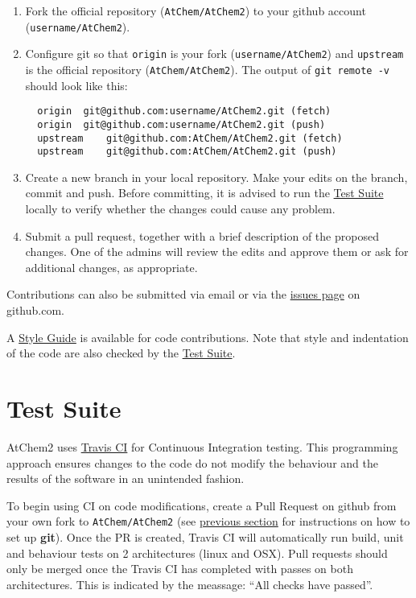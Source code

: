 \begin{enumerate}
\item Fork the official repository (\texttt{AtChem/AtChem2}) to your
  github account (\texttt{username/AtChem2}).
\item Configure git so that \texttt{origin} is your fork
  (\texttt{username/AtChem2}) and \texttt{upstream} is the official
  repository (\texttt{AtChem/AtChem2}). The output of \texttt{git\
    remote\ -v} should look like this:
  \begin{verbatim}
  origin  git@github.com:username/AtChem2.git (fetch)
  origin  git@github.com:username/AtChem2.git (push)
  upstream    git@github.com:AtChem/AtChem2.git (fetch)
  upstream    git@github.com:AtChem/AtChem2.git (push)
\end{verbatim}
\item Create a new branch in your local repository. Make your edits on
  the branch, commit and push. Before committing, it is advised to run
  the \hyperref[sec:testsuite]{Test Suite} locally to verify whether
  the changes could cause any problem.
\item Submit a pull request, together with a brief description of the
  proposed changes. One of the admins will review the edits and
  approve them or ask for additional changes, as appropriate.
\end{enumerate}

Contributions can also be submitted via email or via the
\href{https://github.com/AtChem/AtChem2/issues}{issues page} on
github.com.

A \hyperref[sec:style]{Style Guide} is available for code
contributions. Note that style and indentation of the code are also
checked by the \hyperref[sec:testsuite]{Test Suite}.

\section{Test Suite} \label{sec:testsuite}

AtChem2 uses \href{https://travis-ci.org/}{Travis CI} for Continuous
Integration testing. This programming approach ensures changes to the
code do not modify the behaviour and the results of the software in an
unintended fashion.

To begin using CI on code modifications, create a Pull Request on
github from your own fork to \texttt{AtChem/AtChem2} (see
\hyperref[sec:information]{previous section} for instructions on how
to set up \textbf{git}). Once the PR is created, Travis CI will
automatically run build, unit and behaviour tests on 2 architectures
(linux and OSX). Pull requests should only be merged once the Travis
CI has completed with passes on both architectures. This is indicated
by the meassage: ``All checks have passed''.

